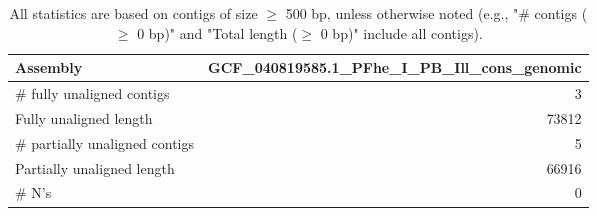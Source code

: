 \documentclass[12pt,a4paper]{article}
\begin{document}
\begin{table}[ht]
\begin{center}
\caption{All statistics are based on contigs of size $\geq$ 500 bp, unless otherwise noted (e.g., "\# contigs ($\geq$ 0 bp)" and "Total length ($\geq$ 0 bp)" include all contigs).}
\begin{tabular}{|l*{1}{|r}|}
\hline
Assembly & GCF\_040819585.1\_PFhe\_I\_PB\_Ill\_cons\_genomic \\ \hline
\# fully unaligned contigs & 3 \\ \hline
Fully unaligned length & 73812 \\ \hline
\# partially unaligned contigs & 5 \\ \hline
Partially unaligned length & 66916 \\ \hline
\# N's & 0 \\ \hline
\end{tabular}
\end{center}
\end{table}
\end{document}
